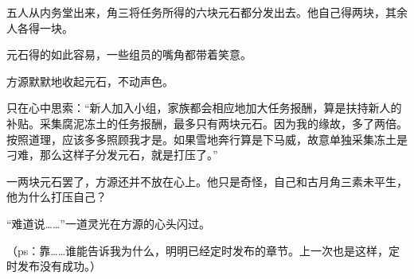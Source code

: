 \begin{this_body}
五人从内务堂出来，角三将任务所得的六块元石都分发出去。他自己得两块，其余人各得一块。

元石得的如此容易，一些组员的嘴角都带着笑意。

方源默默地收起元石，不动声色。

只在心中思索：“新人加入小组，家族都会相应地加大任务报酬，算是扶持新人的补贴。采集腐泥冻土的任务报酬，最多只有两块元石。因为我的缘故，多了两倍。按照道理，应该多多照顾我才是。如果雪地奔行算是下马威，故意单独采集冻土是刁难，那么这样子分发元石，就是打压了。”

一两块元石罢了，方源还并不放在心上。他只是奇怪，自己和古月角三素未平生，他为什么打压自己？

“难道说……”一道灵光在方源的心头闪过。

（ps：靠……谁能告诉我为什么，明明已经定时发布的章节。上一次也是这样，定时发布没有成功。）

\end{this_body}

